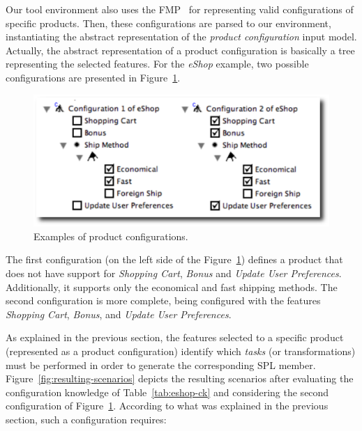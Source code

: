 Our tool environment also uses the FMP~\cite{Czarnecki:2004aa} for representing valid configurations
of specific products. Then, these configurations are parsed to our
environment, instantiating the abstract representation of the \emph{product
configuration} input model. Actually, the abstract representation of a product
configuration is basically a tree representing the selected features. For the
\emph{eShop} example, two possible configurations are presented in
Figure~\ref{fig:product-config-01-02}.

 \begin{figure}[h]
 \begin{center}
  \includegraphics[scale=0.33]{img/pc-04.eps}
   \caption{Examples of product configurations.}
  \label{fig:product-config-01-02}
  \end{center}
\end{figure}

The first configuration (on the left side of the
Figure~\ref{fig:product-config-01-02}) defines a product that does not have support for
\emph{Shopping Cart}, \emph{Bonus} and \emph{Update User Preferences}.
Additionally, it supports only the economical and fast shipping methods. The
second configuration is more complete, being configured with the features
\emph{Shopping Cart}, \emph{Bonus}, and \emph{Update User Preferences}.

As explained in the previous section, the features selected to a specific product
(represented as a product configuration) identify which \emph{tasks} (or
transformations) must be performed in order to generate the corresponding SPL
member. 
Figure~\ref{fig:resulting-scenarios} depicts the resulting scenarios after evaluating the configuration knowledge of
Table~\ref{tab:eshop-ck} and considering the second configuration of
Figure~\ref{fig:product-config-01-02}. According to what was explained in the
previous section, such a configuration requires: 

